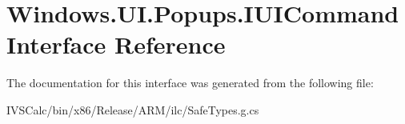 \hypertarget{interface_windows_1_1_u_i_1_1_popups_1_1_i_u_i_command}{}\section{Windows.\+U\+I.\+Popups.\+I\+U\+I\+Command Interface Reference}
\label{interface_windows_1_1_u_i_1_1_popups_1_1_i_u_i_command}


The documentation for this interface was generated from the following file\+:\begin{DoxyCompactItemize}
\item 
I\+V\+S\+Calc/bin/x86/\+Release/\+A\+R\+M/ilc/Safe\+Types.\+g.\+cs\end{DoxyCompactItemize}
